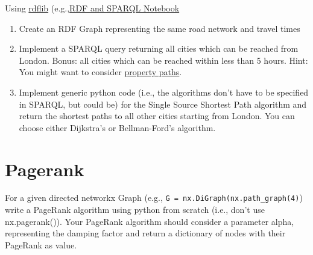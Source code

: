\documentclass[12pt,a4paper]{article}
\begin{document}
Using \href{https://rdflib.readthedocs.io/en/stable/index.html}{rdflib} (e.g.,\href{https://colab.research.google.com/github/joerg84/Graph_Powered_ML_Workshop/blob/master/Sparql.ipynb}{RDF and SPARQL Notebook}
\begin{enumerate}
    \item Create an RDF Graph representing the same road network and travel times
    \item Implement a SPARQL query returning all cities which can be reached from London. Bonus: all cities which can be reached within less than 5 hours. Hint: You might want to consider \href{https://www.w3.org/TR/sparql11-property-paths/}{property paths}.
    \item Implement generic python code (i.e., the algorithms don't have to be specified in SPARQL, but could be) for the Single Source Shortest Path algorithm and return the shortest paths to all other cities starting from London. You can choose either Dijkstra's or Bellman-Ford's algorithm.
\end{enumerate}


\section{Pagerank}
\lstset{language=Python}
For a given directed networkx Graph (e.g., 
\lstinline"G = nx.DiGraph(nx.path_graph(4)") write a PageRank algorithm using python from scratch (i.e., don't use nx.pagerank()).
Your PageRank algorithm should consider a parameter alpha, representing the damping factor and return a dictionary of nodes with their PageRank as value.
\end{document}
